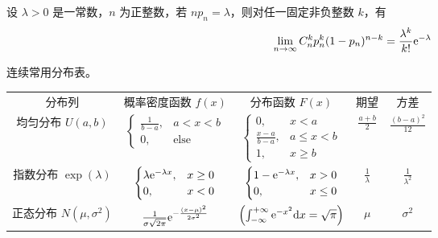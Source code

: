 \documentclass{ctexbook}
\def\diff{\textnormal{d}}
\def\e{\textnormal{e}}
\begin{document}
\begin{theorem}[Possion 定理]
    设 $\lambda>0$ 是一常数，$n$ 为正整数，若 $np_n=\lambda$，则对任一固定非负整数 $k$，有
    \begin{equation}
        \lim_{n\rightarrow\infty}C_n^kp_n^k(1-p_n)^{n-k}=\frac{\lambda^k}{k!}\e^{-\lambda}
    \end{equation}
\end{theorem}

\begin{proposition}[连续常用分布]
    连续常用分布表。

    \noindent\begin{tabular}{ccccc}
        分布列 & 概率密度函数 $f(x)$ & 分布函数 $F(x)$ & 期望 & 方差 \\
        均匀分布 $U(a,b)$ & $\begin{cases}
            \frac{1}{b-a}, &a<x<b\\
            0, &\text{else}
        \end{cases}$ & $\begin{cases}
            0, &x<a \\
            \frac{x-a}{b-a}, &a\leq x<b\\
            1, &x\geq b
        \end{cases}$ & $\frac{a+b}{2}$ & $\frac{(b-a)^2}{12}$  \\
        指数分布 $\exp(\lambda)$ & $\begin{cases}
            \lambda\e^{-\lambda x}, &x\geq 0\\
            0, &x<0
        \end{cases}$ & $\begin{cases}
            1-\e^{-\lambda x},&x>0\\
            0,&x\leq 0
        \end{cases}$ & $\frac{1}{\lambda}$ & $\frac{1}{\lambda^2}$\\
        正态分布 $N(\mu,\sigma^2)$ & $\frac{1}{\sigma\sqrt{2\pi}}\e^{-\frac{(x-\mu)^2}{2\sigma^2}}$ & $\left(\int_{-\infty}^{+\infty}\e^{-x^2}\diff x=\sqrt{\pi}\right)$ & $\mu$ & $\sigma^2$
    \end{tabular}
\end{proposition}
\end{document}
